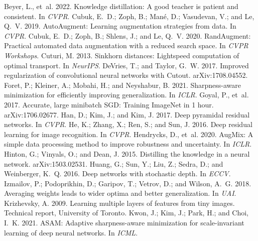 \begin{thebibliography}{}
\footnotesize
\setlength{\itemsep}{0pt}
 Beyer, L., et~al. 2022. Knowledge distillation: A good teacher is patient and consistent. In \emph{CVPR}.
 Cubuk, E.~D.; Zoph, B.; Man\'e, D.; Vasudevan, V.; and Le, Q.~V. 2019. AutoAugment: Learning augmentation strategies from data. In \emph{CVPR}.
 Cubuk, E.~D.; Zoph, B.; Shlens, J.; and Le, Q.~V. 2020. RandAugment: Practical automated data augmentation with a reduced search space. In \emph{CVPR Workshops}.
 Cuturi, M. 2013. Sinkhorn distances: Lightspeed computation of optimal transport. In \emph{NeurIPS}.
 DeVries, T.; and Taylor, G.~W. 2017. Improved regularization of convolutional neural networks with Cutout. arXiv:1708.04552.
 Foret, P.; Kleiner, A.; Mobahi, H.; and Neyshabur, B. 2021. Sharpness-aware minimization for efficiently improving generalization. In \emph{ICLR}.
 Goyal, P., et~al. 2017. Accurate, large minibatch SGD: Training ImageNet in 1 hour. arXiv:1706.02677.
 Han, D.; Kim, J.; and Kim, J. 2017. Deep pyramidal residual networks. In \emph{CVPR}.
 He, K.; Zhang, X.; Ren, S.; and Sun, J. 2016. Deep residual learning for image recognition. In \emph{CVPR}.
 Hendrycks, D., et~al. 2020. AugMix: A simple data processing method to improve robustness and uncertainty. In \emph{ICLR}.
 Hinton, G.; Vinyals, O.; and Dean, J. 2015. Distilling the knowledge in a neural network. arXiv:1503.02531.
 Huang, G.; Sun, Y.; Liu, Z.; Sedra, D.; and Weinberger, K.~Q. 2016. Deep networks with stochastic depth. In \emph{ECCV}.
 Izmailov, P.; Podoprikhin, D.; Garipov, T.; Vetrov, D.; and Wilson, A.~G. 2018. Averaging weights leads to wider optima and better generalization. In \emph{UAI}.
 Krizhevsky, A. 2009. Learning multiple layers of features from tiny images. Technical report, University of Toronto.
 Kwon, J.; Kim, J.; Park, H.; and Choi, I.~K. 2021. ASAM: Adaptive sharpness-aware minimization for scale-invariant learning of deep neural networks. In \emph{ICML}.

\end{thebibliography}
